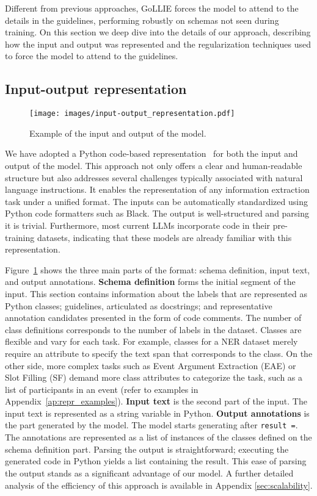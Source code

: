 Different from previous approaches, \GoLLIE GoLLIE forces the model to attend to the details in the guidelines, performing robustly on schemas not seen during training. On this section we deep dive into the details of our approach, describing how the input and output was represented and the regularization techniques used to force the model to attend to the guidelines.

\subsection{Input-output representation}

\begin{figure}
    \centering
    \texttt{[image: images/input-output\_representation.pdf]}
    \caption{Example of the input and output of the model.}
    \label{fig:input-output}
    \vspace{-0.8em}
\end{figure}

We have adopted a Python code-based representation~\citep{wang-etal-2023-code4struct, li-etal-2023-codeie} for both the input and output of the model. This approach not only offers a clear and human-readable structure but also addresses several challenges typically associated with natural language instructions. It enables the representation of any information extraction task under a unified format. The inputs can be automatically standardized using Python code formatters such as Black. The output is well-structured and parsing it is trivial. Furthermore, most current LLMs incorporate code in their pre-training datasets, indicating that these models are already familiar with this representation.

Figure~\ref{fig:input-output} shows the three main parts of the format: schema definition, input text, and output annotations. \textbf{Schema definition} forms the initial segment of the input. This section contains information about the labels that are represented as Python classes; guidelines, articulated as docstrings; and representative annotation candidates presented in the form of code comments. The number of class definitions corresponds to the number of labels in the dataset. Classes are flexible and vary for each task. For example, classes for a NER dataset merely require an attribute to specify the text span that corresponds to the class. On the other side, more complex tasks such as Event Argument Extraction (EAE) or Slot Filling (SF) demand more class attributes to categorize the task, such as a list of participants in an event (refer to examples in Appendix~\ref{ap:repr_examples}). \textbf{Input text} is the second part of the input. The input text is represented as a string variable in Python. \textbf{Output annotations} is the part generated by the model. The model starts generating after \texttt{result =}. The annotations are represented as a list of instances of the classes defined on the schema definition part. Parsing the output is straightforward; executing the generated code in Python yields a list containing the result. This ease of parsing the output stands as a significant advantage of our model. A further detailed analysis of the efficiency of this approach is available in Appendix \ref{sec:scalability}. 


